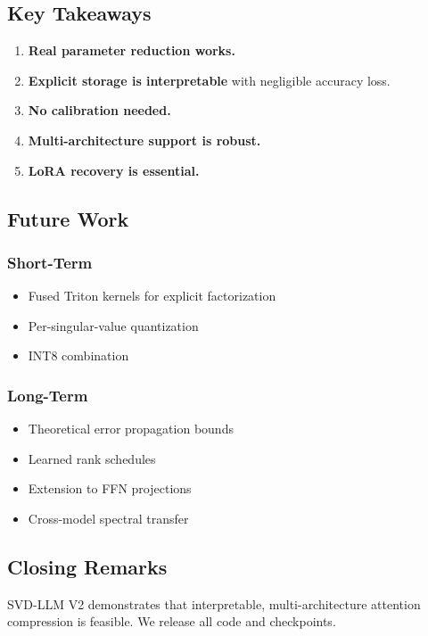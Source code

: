 \subsection{Key Takeaways}

\begin{enumerate}
\item \textbf{Real parameter reduction works.}
\item \textbf{Explicit storage is interpretable} with negligible accuracy loss.
\item \textbf{No calibration needed.}
\item \textbf{Multi-architecture support is robust.}
\item \textbf{LoRA recovery is essential.}

\end{enumerate}
\subsection{Future Work}

\subsubsection{Short-Term}
\begin{itemize}
\item Fused Triton kernels for explicit factorization
\item Per-singular-value quantization
\item INT8 combination

\end{itemize}
\subsubsection{Long-Term}
\begin{itemize}
\item Theoretical error propagation bounds
\item Learned rank schedules
\item Extension to FFN projections
\item Cross-model spectral transfer

\end{itemize}
\subsection{Closing Remarks}

SVD-LLM V2 demonstrates that interpretable, multi-architecture attention 
compression is feasible. We release all code and checkpoints.

